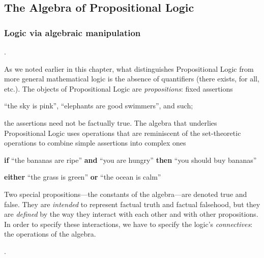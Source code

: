 \subsection{The Algebra of Propositional Logic}
\label{sec:Propositional-logic}

\subsubsection{Logic via algebraic manipulation}

.

\noindent
As we noted earlier in this chapter, what distinguishes Propositional
Logic from more general mathematical logic is the absence of
quantifiers ({\sc there exists}, {\sc for all}, etc.).  The objects of
Propositional Logic are {\it propositions}: fixed assertions

\smallskip

``the sky is pink'', ``elephants are good swimmers'', and such;

\smallskip

\noindent 
the assertions need not be factually true.  The algebra that underlies
Propositional Logic uses operations that are reminiscent of the
set-theoretic operations to combine simple assertions into complex
ones

\smallskip

{\bf if} ``the bananas are ripe'' {\bf and} ``you are hungry'' {\bf then}
 ``you should buy bananas''

\smallskip

{\bf either} ``the grass is green'' {\bf or} ``the ocean is calm''

\smallskip

\noindent
Two special propositions---the constants of the algebra---are denoted
{\sc true} and {\sc false}.  They are {\em intended} to represent factual
truth and factual falsehood, but they are {\em defined} by the way
they interact with each other and with other propositions.  In order
to specify these interactions, we have to specify the logic's {\it
  connectives}: the operations of the algebra.

\bigskip

.

